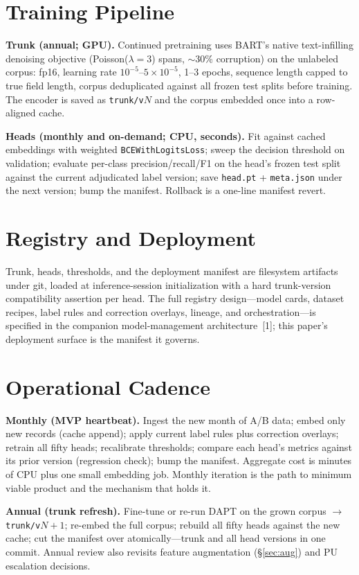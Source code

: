 \documentclass[conference]{IEEEtran}
\begin{document}
\section{Training Pipeline}
\textbf{Trunk (annual; GPU).} Continued pretraining uses BART's native text-infilling denoising objective (Poisson($\lambda{=}3$) spans, $\sim$30\% corruption) on the unlabeled corpus: fp16, learning rate $10^{-5}$--$5{\times}10^{-5}$, 1--3 epochs, sequence length capped to true field length, corpus deduplicated against all frozen test splits before training. The encoder is saved as \texttt{trunk/v$N$} and the corpus embedded once into a row-aligned cache.

\textbf{Heads (monthly and on-demand; CPU, seconds).} Fit against cached embeddings with weighted \texttt{BCEWithLogitsLoss}; sweep the decision threshold on validation; evaluate per-class precision/recall/F1 on the head's frozen test split against the current adjudicated label version; save \texttt{head.pt} + \texttt{meta.json} under the next version; bump the manifest. Rollback is a one-line manifest revert.

\section{Registry and Deployment}
Trunk, heads, thresholds, and the deployment manifest are filesystem artifacts under git, loaded at inference-session initialization with a hard trunk-version compatibility assertion per head. The full registry design---model cards, dataset recipes, label rules and correction overlays, lineage, and orchestration---is specified in the companion model-management architecture~[1]; this paper's deployment surface is the manifest it governs.

\section{Operational Cadence}
\label{sec:cadence}
\textbf{Monthly (MVP heartbeat).} Ingest the new month of A/B data; embed only new records (cache append); apply current label rules plus correction overlays; retrain all fifty heads; recalibrate thresholds; compare each head's metrics against its prior version (regression check); bump the manifest. Aggregate cost is minutes of CPU plus one small embedding job. Monthly iteration is the path to minimum viable product and the mechanism that holds it.

\textbf{Annual (trunk refresh).} Fine-tune or re-run DAPT on the grown corpus $\rightarrow$ \texttt{trunk/v$N{+}1$}; re-embed the full corpus; rebuild all fifty heads against the new cache; cut the manifest over atomically---trunk and all head versions in one commit. Annual review also revisits feature augmentation (\S\ref{sec:aug}) and PU escalation decisions.
\end{document}
